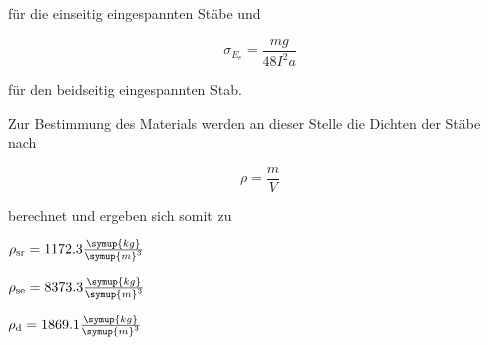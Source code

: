 für die einseitig eingespannten Stäbe und

\begin{equation}
  \sigma_\text{$E_e$} = \frac{m g}{48 I^2 a}
\end{equation}

für den beidseitig eingespannten Stab.

Zur Bestimmung des Materials werden an dieser Stelle die Dichten der Stäbe nach

\begin{equation}
  \rho = \frac{m}{V}
\end{equation}

berechnet und ergeben sich somit zu

\vspace{.05em}
\centerline{$\rho_\text{sr} = 1172.3 \frac{\symup{kg}}{\symup{m}^3}$}
\vspace{.05em}

\vspace{.05em}
\centerline{$\rho_\text{se} = 8373.3 \frac{\symup{kg}}{\symup{m}^3}$}
\vspace{.05em}

\vspace{.05em}
\centerline{$\rho_\text{d} = 1869.1 \frac{\symup{kg}}{\symup{m}^3}$}
\vspace{.05em}